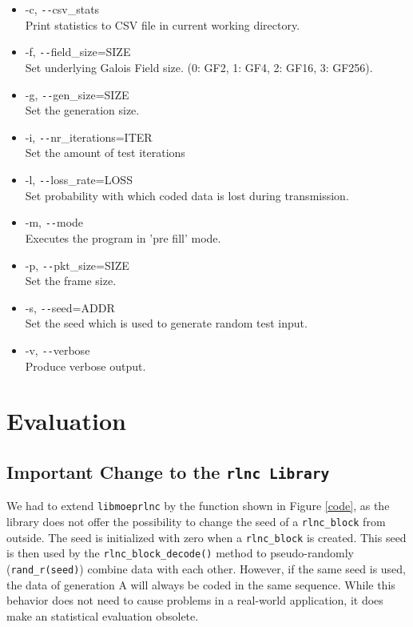 \documentclass[a4paper,english,10pt]{tumarticle}
\begin{document}
\begin{itemize}
    \item -c, \texttt{-{}-}csv\_stats\\
    Print statistics to CSV file in current working directory.

    \item -f, \texttt{-{}-}field\_size=SIZE\\
    Set underlying Galois Field size. (0: GF2, 1: GF4, 2: GF16, 3: GF256).

    \item -g, \texttt{-{}-}gen\_size=SIZE\\
    Set the generation size.

    \item -i, \texttt{-{}-}nr\_iterations=ITER\\
    Set the amount of test iterations

    \item -l, \texttt{-{}-}loss\_rate=LOSS\\
    Set probability with which coded data is lost during transmission.

    \item -m, \texttt{-{}-}mode\\
    Executes the program in 'pre fill' mode.

    \item -p, \texttt{-{}-}pkt\_size=SIZE\\
    Set the frame size.

    \item -s, \texttt{-{}-}seed=ADDR\\
    Set the seed which is used to generate random test input.

    \item -v, \texttt{-{}-}verbose\\
    Produce verbose output.
\end{itemize}

\section{Evaluation}\label{sec:eval}
\subsection{Important Change to the \texttt{rlnc Library}}
We had to extend \texttt{libmoeprlnc} by the function shown in Figure \ref{code}, as the 
library does not offer the possibility to change the seed of a \texttt{rlnc\_block} from outside. The seed is 
initialized with zero when a \texttt{rlnc\_block} is created. This seed is then used by the \texttt{rlnc\_block\_decode()}
method to pseudo-randomly (\texttt{rand\_r(seed)}) combine data with each other. However, if the same seed is used, the 
data of generation A will always be coded in the same sequence. 
While this behavior does not need to cause problems in a real-world application, it does make an statistical evaluation obsolete.
\end{document}
